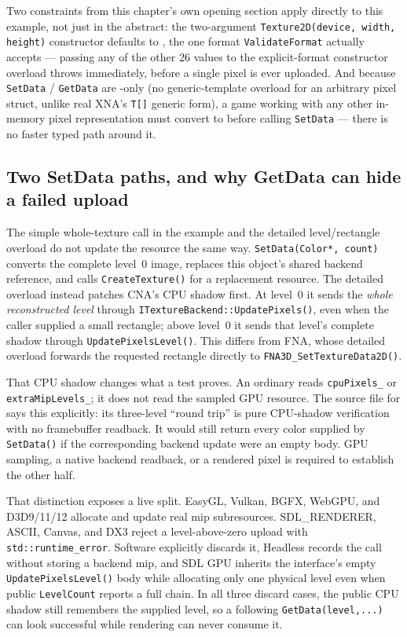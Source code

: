 Two constraints from this chapter's own opening section apply directly to this example, not
just in the abstract: the two-argument \texttt{Texture2D(device, width, height)} constructor
defaults to , the one format \texttt{ValidateFormat} actually
accepts --- passing any of the other 26  values to the explicit-format
constructor overload throws immediately, before a single pixel is ever uploaded. And because
\texttt{SetData} / \texttt{GetData} are -only (no generic-template overload for
an arbitrary pixel struct, unlike real XNA's \texttt{T[]} generic form), a game working with
any other in-memory pixel representation must convert to  before calling
\texttt{SetData} --- there is no faster typed path around it.

\subsection{Two SetData paths, and why GetData can hide a failed upload}
\label{sec:texture2d-update-contract}

The simple whole-texture call in the example and the detailed level/rectangle overload do
not update the resource the same way. \texttt{SetData(Color*, count)} converts the complete
level~0 image, replaces this object's shared backend reference, and calls
\texttt{CreateTexture()} for a replacement resource. The detailed overload instead patches
CNA's CPU shadow first. At level~0 it sends the \emph{whole reconstructed level} through
\texttt{ITextureBackend::UpdatePixels()}, even when the caller supplied a small rectangle;
above level~0 it sends that level's complete shadow through
\texttt{UpdatePixelsLevel()}. This differs from FNA, whose detailed overload forwards the
requested rectangle directly to \texttt{FNA3D\_SetTextureData2D()}.

That CPU shadow changes what a test proves. An ordinary  reads
\texttt{cpuPixels\_} or \texttt{extraMipLevels\_}; it does not read the sampled GPU resource.
The source file for  says this explicitly: its three-level
``round trip'' is pure CPU-shadow verification with no framebuffer readback. It would still
return every color supplied by \texttt{SetData()} if the corresponding backend update were
an empty body. GPU sampling, a native backend readback, or a rendered pixel is required to
establish the other half.

That distinction exposes a live split. EasyGL, Vulkan, BGFX, WebGPU, and D3D9/11/12 allocate
and update real  mip subresources. SDL\_RENDERER, ASCII, Canvas, and DX3
reject a level-above-zero upload with \texttt{std::runtime\_error}. Software explicitly
discards it, Headless records the call without storing a backend mip, and SDL GPU inherits
the interface's empty \texttt{UpdatePixelsLevel()} body while allocating only one physical
level even when public \texttt{LevelCount} reports a full chain. In all three discard cases,
the public CPU shadow still remembers the supplied level, so a following
\texttt{GetData(level,...)} can look successful while rendering can never consume it.

